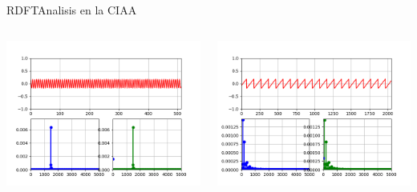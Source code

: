 \begin{frame}[c]{RDFT}{Analisis en la CIAA}
   \protoboardicon
   \begin{columns}[c]
      \begin{column}{.5\textwidth}
         \includegraphics[width=1.0\textwidth]{3_clase/dft_ciaa1}
      \end{column}
      \begin{column}{.5\textwidth}
         \includegraphics[width=1.0\textwidth]{3_clase/dft_ciaa2}
      \end{column}
   \end{columns}
   \vfill
\end{frame}
